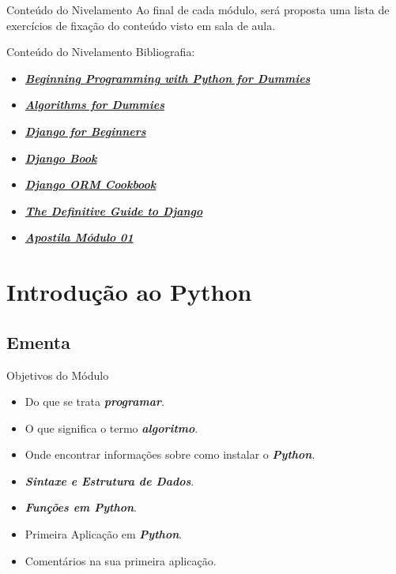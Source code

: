 \documentclass{beamer}
\begin{document}
\begin{frame}{Conteúdo do Nivelamento}
	\label{conteudo_exercicios}
	Ao final de cada módulo, será proposta uma lista de exercícios de fixação do conteúdo visto em sala de aula.
\end{frame}

\begin{frame}{Conteúdo do Nivelamento}
	\label{bibliografia}
	Bibliografia:
	\begin{itemize}
		\item \href{bibliografia/Beginning Programming with Python for Dummies.pdf}{\textbf{\textit{Beginning Programming with Python for Dummies}}}
		\item \href{bibliografia/Algorithms For Dummies.pdf}{\textbf{\textit{Algorithms for Dummies}}}
		\item \href{bibliografia/django-for-beginners-build-websites-with-python-amp-django_compress.pdf}{\textbf{\textit{Django for Beginners}}}
		\item \href{https://django-book.readthedocs.io/en/latest/}{\textbf{\textit{Django Book}}}
		\item \href{https://books.agiliq.com/projects/django-orm-cookbook/en/latest/}{\textbf{\textit{Django ORM Cookbook}}}
		\item \href{bibliografia/The Definitive Guide to Django - Apress.pdf}{\textbf{\textit{The Definitive Guide to Django}}}
		\item \href{apostilas/apostila_modulo_01.pdf}{\textbf{\textit{Apostila Módulo 01}}}
	\end{itemize}
\end{frame}

\section{Introdução ao Python}
\subsection{Ementa}
\begin{frame}{Objetivos do Módulo}
	\label{objetivos_modulo}
\begin{itemize}
	\item Do que se trata \textbf{\textit{programar}}.
	\item O que significa o termo \textbf{\textit{algoritmo}}.
	\item Onde encontrar informações sobre como instalar o \textbf{\textit{Python}}.
	\item \textbf{\textit{Sintaxe e Estrutura de Dados}}.
	\item \textbf{\textit{Funções em Python}}.
	\item Primeira Aplicação em \textbf{\textit{Python}}.
	\item Comentários na sua primeira aplicação.
\end{itemize}
\end{frame}
\end{document}
